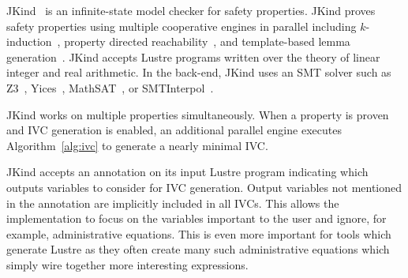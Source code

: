 JKind~\cite{jkind} is an infinite-state model checker for safety
properties. JKind proves safety properties using multiple cooperative
engines in parallel including $k$-induction~\cite{SheeranSS00},
property directed reachability~\cite{Een2011:PDR}, and template-based
lemma generation~\cite{Kahsai2011}. JKind accepts Lustre programs
written over the theory of linear integer and real arithmetic. In the
back-end, JKind uses an SMT solver such as Z3~\cite{DeMoura08:z3},
Yices~\cite{Dutertre06:yices}, MathSAT~\cite{Cimatti2013:MathSAT}, or
SMTInterpol~\cite{Christ2012:SMTInterpol}.

JKind works on multiple properties simultaneously. When a property is
proven and IVC generation is enabled, an additional parallel engine
executes Algorithm~\ref{alg:ivc} to generate a nearly minimal IVC.

JKind accepts an annotation on its input Lustre program indicating
which outputs variables to consider for IVC generation. Output
variables not mentioned in the annotation are implicitly included in
all IVCs. This allows the implementation to focus on the variables
important to the user and ignore, for example, administrative
equations. This is even more important for tools which generate Lustre
as they often create many such administrative equations which simply
wire together more interesting expressions.

